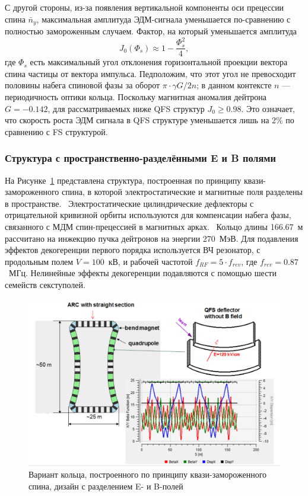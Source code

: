 С другой стороны, из-за появления вертикальной компоненты оси прецессии спина $\bar n_y$, максимальная амплитуда ЭДМ-сигнала уменьшается по-сравнению с полностью замороженным случаем. Фактор, на который уменьшается амплитуда~\cite{Senichev:QFS_IPAC15}
\[
J_0(\Phi_s) \approx 1 - \frac{\Phi_s^2}{4},
\]
где $\Phi_s$ есть максимальный угол отклонения горизонтальной проекции вектора спина частицы от вектора импульса. Педположим, что этот угол не превосходит половины набега спиновой фазы за оборот $\pi\cdot \gamma G/2n$; в данном контексте $n$ --- периодичность оптики кольца. Поскольку магнитная аномалия дейтрона 
${G = -0.142}$, для рассматриваемых ниже QFS структур $J_0\ge 0.98$.
Это означает, что скорость роста ЭДМ сигнала в QFS структуре уменьшается лишь на 2\% по сравнению с  FS структурой. 

\subsubsection{Структура с пространственно-разделёнными E и B полями}\label{chpt2:lattice:QFS:6_3}

На Рисунке~\ref{fig:QFS_6_3_lattice} представлена структура, построенная по принципу 
квази-замороженного спина, в которой электростатические и магнитные поля 
разделены в пространстве.~\cite{Senichev:Lattices} Электростатические цилиндрические дефлекторы 
с отрицательной кривизной орбиты используются для компенсации набега фазы, 
связанного с МДМ спин-прецессией в магнитных арках.~\cite{Senichev:QFS_IPAC15} 
Кольцо длины 166.67~м рассчитано на инжекцию пучка дейтронов на энергии 270~МэВ. 
Для подавления эффектов декогеренции первого порядка используется ВЧ резонатор, 
с продольным полем ${V = 100}$~кВ, и рабочей частотой ${f_{RF} = 5\cdot f_{rev}}$, 
где ${f_{rev} = 0.87}$~МГц. Нелинейные эффекты декогеренции подавляются с помощью шести семейств секступолей.

\begin{figure}[H]
	\centering
	\includegraphics[width=\linewidth]{images/chapter2/6_3_lattice}
	\caption{Вариант кольца, построенного по принципу квази-замороженного спина, 
		дизайн с разделением E- и B-полей
	\label{fig:QFS_6_3_lattice}}
\end{figure}

